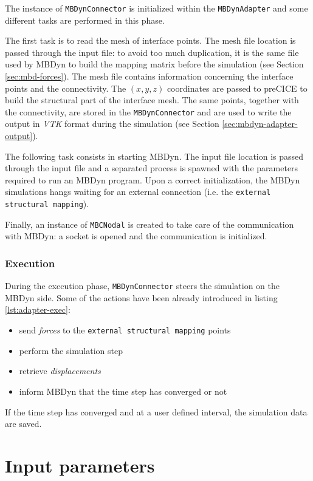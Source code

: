 The instance of \texttt{MBDynConnector} is initialized within the \texttt{MBDynAdapter} and some different tasks are performed in this phase.

The first task is to read the mesh of interface points. The mesh file location is passed through the input file: to avoid too much duplication, it is the same file used by MBDyn to build the mapping matrix before the simulation (see Section \ref{sec:mbd-forces}). The mesh file contains information concerning the interface points and the connectivity. The $(x,y,z)$ coordinates are passed to preCICE to build the structural part of the interface mesh. The same points, together with the connectivity, are stored in the \texttt{MBDynConnector} and are used to write the output in \textit{VTK} format during the simulation (see Section \ref{sec:mbdyn-adapter-output}).

The following task consists in starting MBDyn. The input file location is passed through the input file and a separated process is spawned with the parameters required to run an MBDyn program. Upon a correct initialization, the MBDyn simulations hangs waiting for an external connection (i.e. the \texttt{external structural mapping}).

Finally, an instance of \texttt{MBCNodal} is created to take care of the communication with MBDyn: a socket is opened and the communication is initialized. 


\subsubsection{Execution}

During the execution phase, \texttt{MBDynConnector} steers the simulation on the MBDyn side. Some of the actions have been already introduced in listing \ref{lst:adapter-exec}:

\begin{itemize}
    \item send \textit{forces} to the \texttt{external structural mapping} points
    \item perform the simulation step
    \item retrieve \textit{displacements}
    \item inform MBDyn that the time step has converged or not
\end{itemize}

If the time step has converged and at a user defined interval, the simulation data are saved.


\section{Input parameters}
\label{sec:mbdyn-adapter-input}

